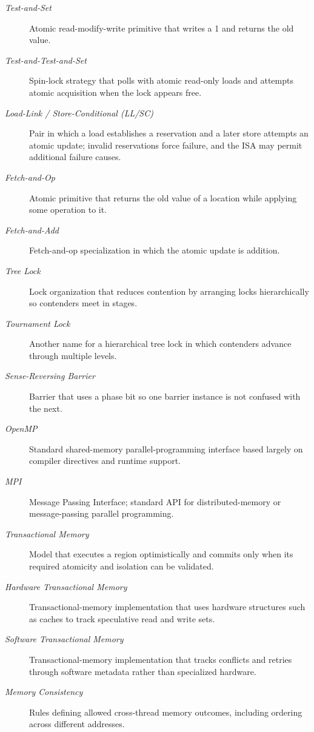 \begin{description}
    \item[\textit{Test-and-Set}] Atomic read-modify-write primitive that writes a 1 and returns the old value.
    \item[\textit{Test-and-Test-and-Set}] Spin-lock strategy that polls with atomic read-only loads and attempts atomic acquisition when the lock appears free.
    \item[\textit{Load-Link / Store-Conditional (LL/SC)}] Pair in which a load establishes a reservation and a later store attempts an atomic update; invalid reservations force failure, and the ISA may permit additional failure causes.
    \item[\textit{Fetch-and-Op}] Atomic primitive that returns the old value of a location while applying some operation to it.
    \item[\textit{Fetch-and-Add}] Fetch-and-op specialization in which the atomic update is addition.
    \item[\textit{Tree Lock}] Lock organization that reduces contention by arranging locks hierarchically so contenders meet in stages.
    \item[\textit{Tournament Lock}] Another name for a hierarchical tree lock in which contenders advance through multiple levels.
    \item[\textit{Sense-Reversing Barrier}] Barrier that uses a phase bit so one barrier instance is not confused with the next.
    \item[\textit{OpenMP}] Standard shared-memory parallel-programming interface based largely on compiler directives and runtime support.
    \item[\textit{MPI}] Message Passing Interface; standard API for distributed-memory or message-passing parallel programming.
    \item[\textit{Transactional Memory}] Model that executes a region optimistically and commits only when its required atomicity and isolation can be validated.
    \item[\textit{Hardware Transactional Memory}] Transactional-memory implementation that uses hardware structures such as caches to track speculative read and write sets.
    \item[\textit{Software Transactional Memory}] Transactional-memory implementation that tracks conflicts and retries through software metadata rather than specialized hardware.
    \item[\textit{Memory Consistency}] Rules defining allowed cross-thread memory outcomes, including ordering across different addresses.

\end{description}
